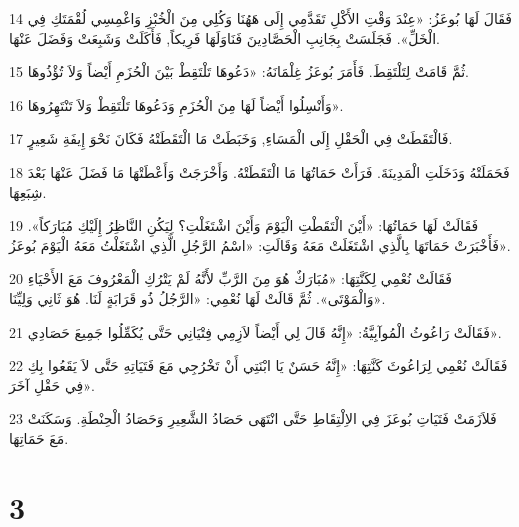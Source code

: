 \par 14 فَقَالَ لَهَا بُوعَزُ: «عِنْدَ وَقْتِ الأَكْلِ تَقَدَّمِي إِلَى هَهُنَا وَكُلِي مِنَ الْخُبْزِ وَاغْمِسِي لُقْمَتَكِ فِي الْخَلِّ». فَجَلَسَتْ بِجَانِبِ الْحَصَّادِينَ فَنَاوَلَهَا فَرِيكاً, فَأَكَلَتْ وَشَبِعَتْ وَفَضَلَ عَنْهَا.
\par 15 ثُمَّ قَامَتْ لِتَلْتَقِطَ. فَأَمَرَ بُوعَزُ غِلْمَانَهُ: «دَعُوهَا تَلْتَقِطْ بَيْنَ الْحُزَمِ أَيْضاً وَلاَ تُؤْذُوهَا.
\par 16 وَأَنْسِلُوا أَيْضاً لَهَا مِنَ الْحُزَمِ وَدَعُوهَا تَلْتَقِطْ وَلاَ تَنْتَهِرُوهَا».
\par 17 فَالْتَقَطَتْ فِي الْحَقْلِ إِلَى الْمَسَاءِ, وَخَبَطَتْ مَا الْتَقَطَتْهُ فَكَانَ نَحْوَ إِيفَةِ شَعِيرٍ.
\par 18 فَحَمَلَتْهُ وَدَخَلَتِ الْمَدِينَةَ. فَرَأَتْ حَمَاتُهَا مَا الْتَقَطَتْهُ. وَأَخْرَجَتْ وَأَعْطَتْهَا مَا فَضَلَ عَنْهَا بَعْدَ شِبَعِهَا.
\par 19 فَقَالَتْ لَهَا حَمَاتُهَا: «أَيْنَ الْتَقَطْتِ الْيَوْمَ وَأَيْنَ اشْتَغَلْتِ؟ لِيَكُنِ النَّاظِرُ إِلَيْكِ مُبَارَكاً». فَأَخْبَرَتْ حَمَاتَهَا بِالَّذِي اشْتَغَلَتْ مَعَهُ وَقَالَتِ: «اسْمُ الرَّجُلِ الَّذِي اشْتَغَلْتُ مَعَهُ الْيَوْمَ بُوعَزُ».
\par 20 فَقَالَتْ نُعْمِي لِكَنَّتِهَا: «مُبَارَكٌ هُوَ مِنَ الرَّبِّ لأَنَّهُ لَمْ يَتْرُكِ الْمَعْرُوفَ مَعَ الأَحْيَاءِ وَالْمَوْتَى». ثُمَّ قَالَتْ لَهَا نُعْمِي: «الرَّجُلُ ذُو قَرَابَةٍ لَنَا. هُوَ ثَانِي وَلِيِّنَا».
\par 21 فَقَالَتْ رَاعُوثُ الْمُوآبِيَّةُ: «إِنَّهُ قَالَ لِي أَيْضاً لاَزِمِي فِتْيَانِي حَتَّى يُكَمِّلُوا جَمِيعَ حَصَادِي».
\par 22 فَقَالَتْ نُعْمِي لِرَاعُوثَ كَنَّتِهَا: «إِنَّهُ حَسَنٌ يَا ابْنَتِي أَنْ تَخْرُجِي مَعَ فَتَيَاتِهِ حَتَّى لاَ يَقَعُوا بِكِ فِي حَقْلِ آخَرَ».
\par 23 فَلاَزَمَتْ فَتَيَاتِ بُوعَزَ فِي الاِلْتِقَاطِ حَتَّى انْتَهَى حَصَادُ الشَّعِيرِ وَحَصَادُ الْحِنْطَةِ. وَسَكَنَتْ مَعَ حَمَاتِهَا.

\chapter{3}

